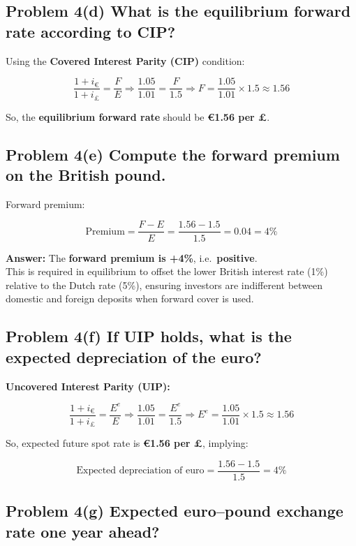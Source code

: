\documentclass[
]{article}
\begin{document}
\subsection{Problem 4(d) What is the equilibrium forward rate according
to
CIP?}\label{problem-4d-what-is-the-equilibrium-forward-rate-according-to-cip}

Using the \textbf{Covered Interest Parity (CIP)} condition:

\[
\frac{1 + i_{\text{€}}}{1 + i_{£}} = \frac{F}{E}
\Rightarrow \frac{1.05}{1.01} = \frac{F}{1.5}
\Rightarrow F = \frac{1.05}{1.01} \times 1.5 \approx 1.56
\]

So, the \textbf{equilibrium forward rate} should be \textbf{€1.56 per
£}.

\subsection{Problem 4(e) Compute the forward premium on the British
pound.}\label{problem-4e-compute-the-forward-premium-on-the-british-pound.}

Forward premium:

\[
\text{Premium} = \frac{F - E}{E} = \frac{1.56 - 1.5}{1.5} = 0.04 = 4\%
\]

\textbf{Answer:} The \textbf{forward premium is +4\%},
i.e.~\textbf{positive}.\\
This is required in equilibrium to offset the lower British interest
rate (1\%) relative to the Dutch rate (5\%), ensuring investors are
indifferent between domestic and foreign deposits when forward cover is
used.

\subsection{Problem 4(f) If UIP holds, what is the expected depreciation
of the
euro?}\label{problem-4f-if-uip-holds-what-is-the-expected-depreciation-of-the-euro}

\textbf{Uncovered Interest Parity (UIP):}

\[
\frac{1 + i_{€}}{1 + i_{£}} = \frac{E^{e}}{E}
\Rightarrow \frac{1.05}{1.01} = \frac{E^{e}}{1.5}
\Rightarrow E^{e} = \frac{1.05}{1.01} \times 1.5 \approx 1.56
\]

So, expected future spot rate is \textbf{€1.56 per £}, implying:

\[
\text{Expected depreciation of euro} = \frac{1.56 - 1.5}{1.5} = 4\%
\]

\subsection{Problem 4(g) Expected euro--pound exchange rate one year
ahead?}\label{problem-4g-expected-europound-exchange-rate-one-year-ahead}
\end{document}
